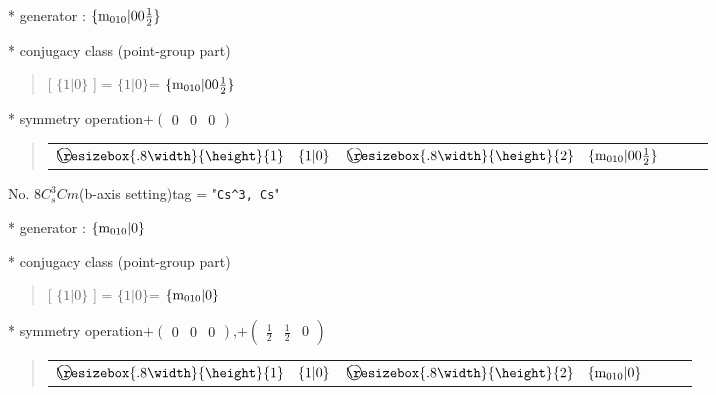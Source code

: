 \documentclass[fleqn,10pt,landscape]{jsarticle}
\begin{document}
* generator : $\{{\rm m}_{010}|0 0 \frac{1}{2}\}$

* conjugacy class (point-group part)
\begin{quote}
[ $\{1|0\}$ ] = \quad $\{1|0\}$\newline[ $\{{\rm m}_{010}|0 0 \frac{1}{2}\}$ ] = \quad $\{{\rm m}_{010}|0 0 \frac{1}{2}\}$\newline
\end{quote}

* symmetry operation\quad$+\begin{pmatrix} 0 & 0 & 0 \end{pmatrix}$
\begin{quote}
\begin{tabular}{lllll}
$ {\ooalign{\hfil\resizebox{.8\width}{\height}{1}\hfil\crcr\raise.1ex\hbox{\large$\bigcirc$}}}\quad \{1|0\} $ & $ {\ooalign{\hfil\resizebox{.8\width}{\height}{2}\hfil\crcr\raise.1ex\hbox{\large$\bigcirc$}}}\quad \{{\rm m}_{010}|0 0 \frac{1}{2}\} $
\end{tabular}
\end{quote}


\newpage

No. 8\quad$C_{s}^{3}$\quad$Cm$\quad(b-axis setting)\quad[ monoclinic ]
tag = "{\tt Cs^3, Cs}"

* generator : $\{{\rm m}_{010}|0\}$

* conjugacy class (point-group part)
\begin{quote}
[ $\{1|0\}$ ] = \quad $\{1|0\}$\newline[ $\{{\rm m}_{010}|0\}$ ] = \quad $\{{\rm m}_{010}|0\}$\newline
\end{quote}

* symmetry operation\quad$+\begin{pmatrix} 0 & 0 & 0 \end{pmatrix}$,\quad $+\begin{pmatrix} \frac{1}{2} & \frac{1}{2} & 0 \end{pmatrix}$
\begin{quote}
\begin{tabular}{lllll}
$ {\ooalign{\hfil\resizebox{.8\width}{\height}{1}\hfil\crcr\raise.1ex\hbox{\large$\bigcirc$}}}\quad \{1|0\} $ & $ {\ooalign{\hfil\resizebox{.8\width}{\height}{2}\hfil\crcr\raise.1ex\hbox{\large$\bigcirc$}}}\quad \{{\rm m}_{010}|0\} $
\end{tabular}
\end{quote}


\newpage
\end{document}
